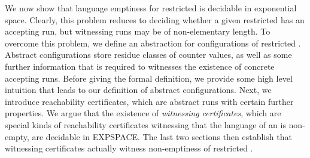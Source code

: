 
We now show that language emptiness for restricted \laVASS is
decidable in exponential space. Clearly, this problem reduces to
deciding whether a given restricted \laVASS has an accepting run, but
witnessing runs may be of non-elementary length. To overcome this
problem, we define an abstraction for configurations of
restricted \laVASS. Abstract configurations store residue classes of
counter values, as well as some further information that is required
to witnesses the existence of concrete accepting runs. Before giving
the formal definition, we provide some high level intuition that leads
to our definition of abstract configurations. Next, we introduce
reachability certificates, which are abstract runs with certain
further properties. We argue that the existence of \emph{witnessing
certificates}, which are special kinds of reachability certificates
witnessing that the language of an \laVASS is non-empty, are decidable
in EXPSPACE. The last two sections then establish that witnessing
certificates actually witness non-emptiness of restricted \laVASS.






